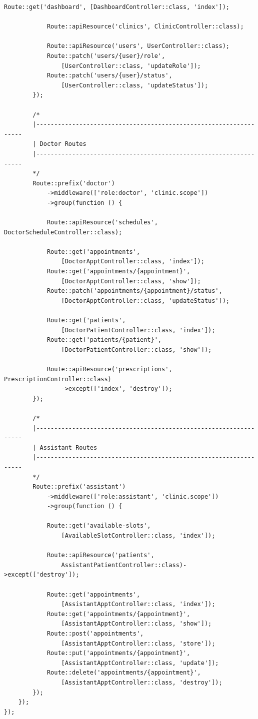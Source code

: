 \begin{lstlisting}[style=php, caption={\texttt{routes/api.php} ---
  Route group definitions with stacked middleware.}]
            Route::get('dashboard', [DashboardController::class, 'index']);

            Route::apiResource('clinics', ClinicController::class);

            Route::apiResource('users', UserController::class);
            Route::patch('users/{user}/role',
                [UserController::class, 'updateRole']);
            Route::patch('users/{user}/status',
                [UserController::class, 'updateStatus']);
        });

        /*
        |------------------------------------------------------------------
        | Doctor Routes
        |------------------------------------------------------------------
        */
        Route::prefix('doctor')
            ->middleware(['role:doctor', 'clinic.scope'])
            ->group(function () {

            Route::apiResource('schedules', DoctorScheduleController::class);

            Route::get('appointments',
                [DoctorApptController::class, 'index']);
            Route::get('appointments/{appointment}',
                [DoctorApptController::class, 'show']);
            Route::patch('appointments/{appointment}/status',
                [DoctorApptController::class, 'updateStatus']);

            Route::get('patients',
                [DoctorPatientController::class, 'index']);
            Route::get('patients/{patient}',
                [DoctorPatientController::class, 'show']);

            Route::apiResource('prescriptions', PrescriptionController::class)
                ->except(['index', 'destroy']);
        });

        /*
        |------------------------------------------------------------------
        | Assistant Routes
        |------------------------------------------------------------------
        */
        Route::prefix('assistant')
            ->middleware(['role:assistant', 'clinic.scope'])
            ->group(function () {

            Route::get('available-slots',
                [AvailableSlotController::class, 'index']);

            Route::apiResource('patients',
                AssistantPatientController::class)->except(['destroy']);

            Route::get('appointments',
                [AssistantApptController::class, 'index']);
            Route::get('appointments/{appointment}',
                [AssistantApptController::class, 'show']);
            Route::post('appointments',
                [AssistantApptController::class, 'store']);
            Route::put('appointments/{appointment}',
                [AssistantApptController::class, 'update']);
            Route::delete('appointments/{appointment}',
                [AssistantApptController::class, 'destroy']);
        });
    });
});
\end{lstlisting}

